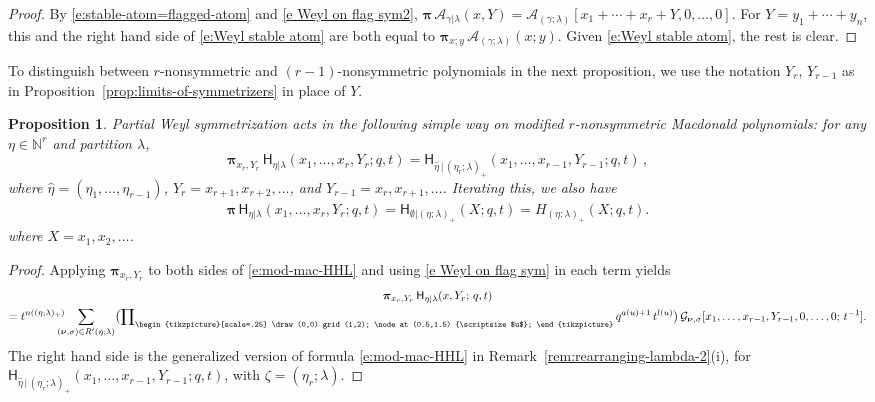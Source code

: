 \documentclass[12pt]{amsart}
\newtheorem{prop}[thm]{Proposition}
\theoremstyle{definition}
\theoremstyle{remark}
\newcommand{\NN}{{\mathbb N}}
\newcommand{\nubold}{{\boldsymbol \nu }}
\newcommand{\pibold}{{\boldsymbol \pi }}
\newcommand{\Weyl}{\pibold }
\newcommand{\Acal}{{\mathcal A}}
\newcommand{\Gcal}{{\mathcal G}}
\newcommand{\etahat}{\widehat{\eta }}
\newcommand{\domino}{\begin{tikzpicture}[scale=.25]
\draw (0,0) grid (1,2);
\node at (0.5,1.5) {\scriptsize $u$};
\end{tikzpicture}}
\newcommand{\mE}{\mathsf H}   %
\begin{document}
\begin{proof}
By \eqref{e:stable-atom=flagged-atom} and \eqref{e Weyl on flag sym2},
$\Weyl\, \Acal_{\gamma | \lambda}(x,Y) = \Acal _{(\gamma ;\lambda
)}[x_{1}+\cdots +x_{r}+Y,0,\ldots,0]$.  For $Y = y_{1}+\cdots +y_{n}$,
this and the right hand side of \eqref{e:Weyl stable atom} are both
equal to $\Weyl _{x;y}\, \Acal _{(\gamma ;\lambda)}(x;y)$.  Given
\eqref{e:Weyl stable atom}, the rest is clear.
\end{proof}

To distinguish between $r$-nonsymmetric and $(r-1)$-nonsymmetric
polynomials in the next proposition, we use the notation $Y_{r}$,
$Y_{r-1}$ as in Proposition~\ref{prop:limits-of-symmetrizers} in place
of $Y$.

\begin{prop}\label{p:Weyl modnsmac}
Partial Weyl symmetrization acts in the following simple way on
modified $r$-nonsymmetric Macdonald polynomials: for any $\eta \in
\NN^r$ and partition $\lambda$,
\begin{equation}\label{e Weyl modnsmac}
\Weyl_{x_{r},Y_{r}}\,  \mE_{\eta | \lambda}(x_{1},\ldots,x_{r},
Y_{r};q,t) = \mE_{\etahat\,  |\,  (\eta_r;\lambda)_+}(x_1,\dots, x_{r-1},
Y_{r-1};q,t)\, ,
\end{equation}
where $\etahat  = (\eta _{1},\ldots,\eta _{r-1})$,
$Y_{r} = x_{r+1},x_{r+2},\dots $, and $Y_{r-1} = x_{r}, x_{r+1}, \ldots$.
Iterating this, we also have
\begin{align}
\label{e Weyl modnsmac2} \Weyl \, \mE_{\eta | \lambda}(x_1,\dots, x_r,
Y_{r}; q,t) = \mE_{\emptyset | (\eta ;\lambda)_+}(X;q,t) =
H_{(\eta;\lambda)_+}(X;q,t).
\end{align}
where $X = x_{1},x_{2},\ldots $.
\end{prop}

\begin{proof}
Applying $\Weyl_{x_{r}, Y_{r}}$ to both sides of \eqref{e:mod-mac-HHL}
and using \eqref{e Weyl on flag sym} in each
term yields
\begin{multline}\label{e Weyl LLT}
\Weyl_{x_r, Y_{r}}\,  \mE_{\eta | \lambda}(x, Y_{r};\, q,t) \\
= t^{n((\eta ;\lambda ) _{+})} \hspace{-2ex}\sum_{(\nubold ,\sigma
)\in R'(\eta;\lambda)} \bigl( \prod \nolimits_{\domino } q^{a(u)+1}\,
t^{l(u)} \bigr)\, \Gcal _{\nubold ,\sigma }[x_{1}, \ldots,x_{r-1},
Y_{r-1}, 0,\ldots,0;\, t^{-1}].
\end{multline}
The right hand side is the generalized version of formula
\eqref{e:mod-mac-HHL} in Remark~\ref{rem:rearranging-lambda-2}(i), for
$\mE_{\etahat\, |\, (\eta_r;\lambda)_+}(x_1, \dots, x_{r-1}, Y_{r-1}
;q, t)$, with $\zeta =(\eta _{r};\lambda )$.
\end{proof}
\end{document}
